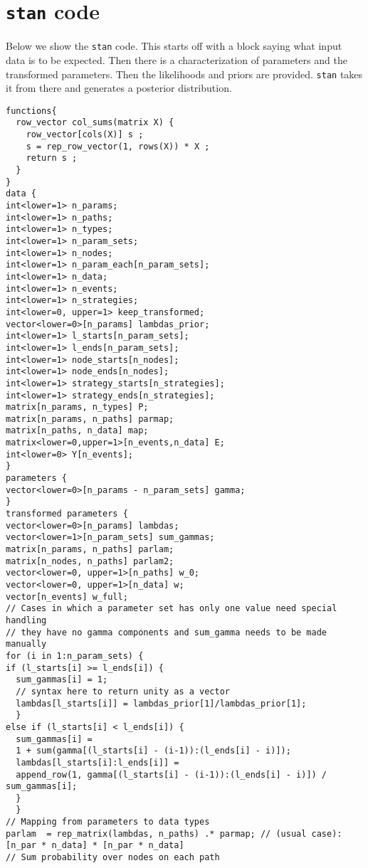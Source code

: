 \documentclass[
  12pt,
]{book}
\begin{document}
\hypertarget{stan-code}{%
\section{\texorpdfstring{\texttt{stan} code}{stan code}}\label{stan-code}}

Below we show the \texttt{stan} code. This starts off with a block saying what input data is to be expected. Then there is a characterization of parameters and the transformed parameters. Then the likelihoods and priors are provided. \texttt{stan} takes it from there and generates a posterior distribution.

\begin{verbatim}
functions{
  row_vector col_sums(matrix X) {
    row_vector[cols(X)] s ;
    s = rep_row_vector(1, rows(X)) * X ;
    return s ;
  }
}
data {
int<lower=1> n_params;
int<lower=1> n_paths;
int<lower=1> n_types;
int<lower=1> n_param_sets;
int<lower=1> n_nodes;
int<lower=1> n_param_each[n_param_sets];
int<lower=1> n_data;
int<lower=1> n_events;
int<lower=1> n_strategies;
int<lower=0, upper=1> keep_transformed;
vector<lower=0>[n_params] lambdas_prior;
int<lower=1> l_starts[n_param_sets];
int<lower=1> l_ends[n_param_sets];
int<lower=1> node_starts[n_nodes];
int<lower=1> node_ends[n_nodes];
int<lower=1> strategy_starts[n_strategies];
int<lower=1> strategy_ends[n_strategies];
matrix[n_params, n_types] P;
matrix[n_params, n_paths] parmap;
matrix[n_paths, n_data] map;
matrix<lower=0,upper=1>[n_events,n_data] E;
int<lower=0> Y[n_events];
}
parameters {
vector<lower=0>[n_params - n_param_sets] gamma;
}
transformed parameters {
vector<lower=0>[n_params] lambdas;
vector<lower=1>[n_param_sets] sum_gammas;
matrix[n_params, n_paths] parlam;
matrix[n_nodes, n_paths] parlam2;
vector<lower=0, upper=1>[n_paths] w_0;
vector<lower=0, upper=1>[n_data] w;
vector[n_events] w_full;
// Cases in which a parameter set has only one value need special handling
// they have no gamma components and sum_gamma needs to be made manually
for (i in 1:n_param_sets) {
if (l_starts[i] >= l_ends[i]) {
  sum_gammas[i] = 1;
  // syntax here to return unity as a vector
  lambdas[l_starts[i]] = lambdas_prior[1]/lambdas_prior[1];
  }
else if (l_starts[i] < l_ends[i]) {
  sum_gammas[i] =
  1 + sum(gamma[(l_starts[i] - (i-1)):(l_ends[i] - i)]);
  lambdas[l_starts[i]:l_ends[i]] =
  append_row(1, gamma[(l_starts[i] - (i-1)):(l_ends[i] - i)]) / sum_gammas[i];
  }
  }
// Mapping from parameters to data types
parlam  = rep_matrix(lambdas, n_paths) .* parmap; // (usual case): [n_par * n_data] * [n_par * n_data]
// Sum probability over nodes on each path

\end{verbatim}
\end{document}
